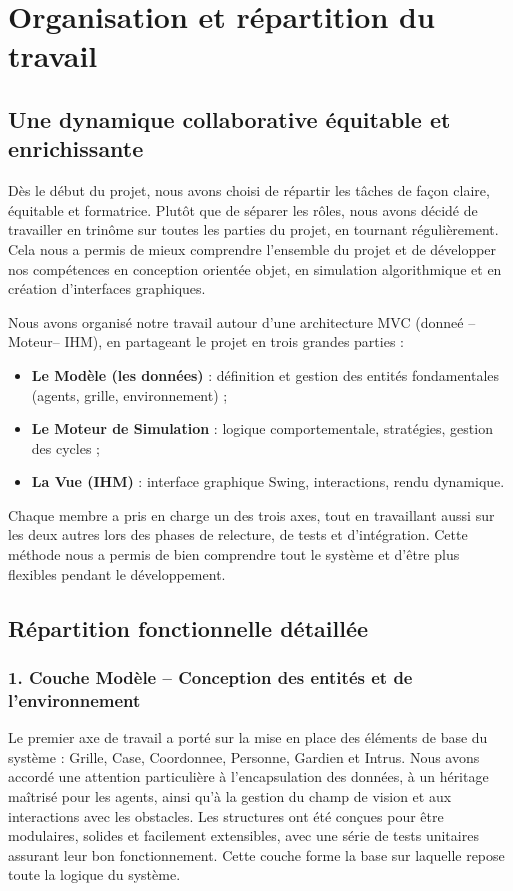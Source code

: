 

\section{Organisation et répartition du travail}

\subsection{Une dynamique collaborative équitable et enrichissante}
Dès le début du projet, nous avons choisi de répartir les tâches de façon claire, équitable et formatrice. Plutôt que de séparer les rôles, nous avons décidé de travailler en trinôme sur toutes les parties du projet, en tournant régulièrement. Cela nous a permis de mieux comprendre l’ensemble du projet et de développer nos compétences en conception orientée objet, en simulation algorithmique et en création d’interfaces graphiques.

Nous avons organisé notre travail autour d’une architecture MVC (donneé – Moteur– IHM), en partageant le projet en trois grandes parties :

\begin{itemize}
    \item \textbf{Le Modèle (les données) } : définition et gestion des entités fondamentales (agents, grille, environnement) ;
    \item \textbf{Le Moteur de Simulation} : logique comportementale, stratégies, gestion des cycles ;
    \item \textbf{La Vue (IHM)} : interface graphique Swing, interactions, rendu dynamique.
\end{itemize}
Chaque membre a pris en charge un des trois axes, tout en travaillant aussi sur les deux autres lors des phases de relecture, de tests et d’intégration. Cette méthode nous a permis de bien comprendre tout le système et d’être plus flexibles pendant le développement.



\subsection{Répartition fonctionnelle détaillée}

\subsubsection*{1. Couche Modèle – Conception des entités et de l’environnement}
Le premier axe de travail a porté sur la mise en place des éléments de base du système : Grille, Case, Coordonnee, Personne, Gardien et Intrus. Nous avons accordé une attention particulière à l’encapsulation des données, à un héritage maîtrisé pour les agents, ainsi qu’à la gestion du champ de vision et aux interactions avec les obstacles.
Les structures ont été conçues pour être modulaires, solides et facilement extensibles, avec une série de tests unitaires assurant leur bon fonctionnement. Cette couche forme la base sur laquelle repose toute la logique du système.

